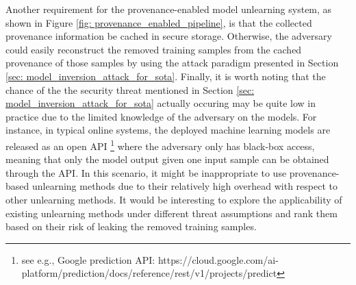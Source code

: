 \documentclass[11pt]{article}
\begin{document}
Another requirement for the provenance-enabled model unlearning system, as shown in Figure \ref{fig: provenance_enabled_pipeline}, is that the collected provenance information be cached in secure storage. Otherwise, the adversary could easily reconstruct the removed training samples from the cached provenance of those samples by using the attack paradigm presented in Section \ref{sec: model_inversion_attack_for_sota}. %
%
Finally, it is worth noting that the chance of the the security threat mentioned in Section \ref{sec: model_inversion_attack_for_sota} actually occuring may be quite low in practice due to the limited knowledge of the adversary on the models. For instance, in  typical online systems, the deployed machine learning models are released as an open API \footnote{see e.g., Google prediction API: {https://cloud.google.com/ai-platform/prediction/docs/reference/rest/v1/projects/predict}} where the adversary only has black-box access, meaning that only the model output given one input sample can be obtained through the API. In this scenario, it might be inappropriate to use provenance-based unlearning methods due to their relatively high overhead with respect to other unlearning methods. It would be interesting to explore the applicability of existing unlearning methods under different threat assumptions and rank them based on their risk of leaking the removed training samples.





\end{document}
